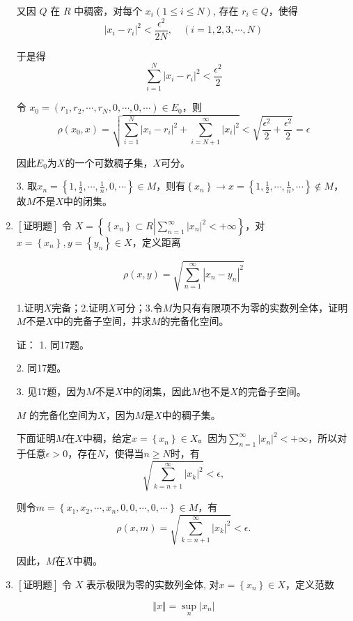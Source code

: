 \documentclass{article}
\begin{document}
\begin{enumerate}
又因 $Q$ 在 $R$ 中稠密，对每个 $x_i(1 \leq i \leq N)$, 存在 $r_i \in Q$，使得
$$
\left|x_i-r_i\right|^2<\frac{\epsilon^2}{2 N}, \quad(i=1,2,3, \cdots, N)
$$

于是得
$$
\sum_{i=1}^N\left|x_i-r_i\right|^2<\frac{\epsilon^2}{2}
$$

令 $x_0=\left(r_1, r_2, \cdots, r_N, 0, \cdots, 0, \cdots\right) \in E_0$，则
$$
\rho \left(x_0, x\right)=\sqrt{\sum_{i=1}^N\left|x_i-r_i\right|^2+\sum_{i=N+1}^{\infty}\left|x_{i}\right|^2}<\sqrt{\frac{\epsilon ^ 2}{2} + \frac{\epsilon ^ 2}{2}}=\epsilon
$$

因此$E_0$为$X$的一个可数稠子集，$X$可分。

3. 取$x_n = \left\{1, \frac{1}{2}, \cdots, \frac{1}{n}, 0, \cdots \right\} \in M$，则有$\left\{x_n\right\} \to x = \left\{1, \frac{1}{2}, \cdots, \frac{1}{n}, \cdots \right\} \notin M$，故$M$不是$X$中的闭集。

\item $\left[\textbf{证明题}\right]$ 令 $X=\left\{\left\{x_n\right\} \subset R\left|\sum_{n=1}^{\infty}\left| x_n \right|^2 <+\infty \right.\right\}$，对$x=\left\{x_n\right\},y=\left\{y_n\right\} \in X$，定义距离

$$
\rho\left(x, y\right)=\sqrt{\sum_{n=1}^{\infty}{\left|x_n-y_n\right|}^2}
$$

1.证明$X$完备；2.证明$X$可分；3.令$M$为只有有限项不为零的实数列全体，证明$M$不是$X$中的完备子空间，并求$M$的完备化空间。

证：
1. 同17题。

2. 同17题。

3. 见17题，因为$M$不是$X$中的闭集，因此$M$也不是$X$的完备子空间。

$M$ 的完备化空间为$X$，因为$M$是$X$中的稠子集。

下面证明$M$在$X$中稠，给定$x=\left\{x_n\right\} \in X$。因为$\sum_{n=1}^{\infty}\left| x_n \right|^2 <+\infty$，所以对于任意$\epsilon > 0$，存在$N$，使得当$n \geq N$时，有
$$
\sqrt{\sum_{k=n+1}^{\infty}\left|x_k\right|^2} < \epsilon, 
$$

则令$m = \left\{x_1, x_2, \cdots, x_n, 0, 0, \cdots, 0, \cdots \right\} \in M$，有
$$
\rho\left(x, m\right)=\sqrt{\sum_{k=n+1}^{\infty}{\left|x_k\right|}^2} < \epsilon .
$$

因此，$M$在$X$中稠。

\item $\left[\textbf{证明题}\right]$ 令 $X$ 表示极限为零的实数列全体, 对$x=\left\{x_n\right\} \in X$，定义范数

$$
\Vert x\Vert = \sup_n \left| x_n \right|
$$


\end{enumerate}
\end{document}
